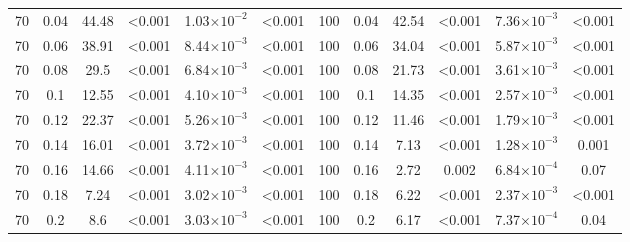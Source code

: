 \documentclass[12pt]{article}
\begin{document}
\begin{spacing}{2.0}
\begin{table}[h!]
\begin{tabular}{c c | c c| c c ||c c | c c | c c |}
                70  & 0.04  & 44.48 & \textless0.001 & 1.03$\times10^{-2}$ & \textless0.001 & 100 & 0.04  & 42.54 & \textless0.001 & 7.36$\times10^{-3}$ & \textless0.001 \\
                70  & 0.06  & 38.91 & \textless0.001 & 8.44$\times10^{-3}$ & \textless0.001 & 100 & 0.06  & 34.04 & \textless0.001 & 5.87$\times10^{-3}$ & \textless0.001 \\
                70  & 0.08  & 29.5  & \textless0.001 & 6.84$\times10^{-3}$ & \textless0.001 & 100 & 0.08  & 21.73 & \textless0.001 & 3.61$\times10^{-3}$ & \textless0.001 \\
                70  & 0.1 & 12.55 & \textless0.001 & 4.10$\times10^{-3}$ & \textless0.001 & 100 & 0.1 & 14.35 & \textless0.001 & 2.57$\times10^{-3}$ & \textless0.001 \\
                70  & 0.12  & 22.37 & \textless0.001 & 5.26$\times10^{-3}$ & \textless0.001 & 100 & 0.12  & 11.46 & \textless0.001 & 1.79$\times10^{-3}$ & \textless0.001 \\
                70  & 0.14  & 16.01 & \textless0.001 & 3.72$\times10^{-3}$ & \textless0.001 & 100 & 0.14  & 7.13  & \textless0.001 & 1.28$\times10^{-3}$ & 0.001  \\
                70  & 0.16  & 14.66 & \textless0.001 & 4.11$\times10^{-3}$ & \textless0.001 & 100 & 0.16  & 2.72  & 0.002  & 6.84$\times10^{-4}$ & 0.07 \\
                70  & 0.18  & 7.24  & \textless0.001 & 3.02$\times10^{-3}$ & \textless0.001 & 100 & 0.18  & 6.22  & \textless0.001 & 2.37$\times10^{-3}$ & \textless0.001 \\
                70  & 0.2 & 8.6 & \textless0.001 & 3.03$\times10^{-3}$ & \textless0.001 & 100 & 0.2 & 6.17  & \textless0.001 & 7.37$\times10^{-4}$ & 0.04 \\
        \hline
	    \end{tabular}
	    \end{table}


\end{spacing}
\end{document}
